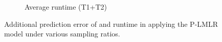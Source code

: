 \begin{figure}[tp]
\begin{subfigure}[]{0.48\columnwidth}
 		\caption{Average runtime (T1+T2)}
 		\label{fig:eval_smapling_error_time}
	\end{subfigure}
	\vspace{-0.1in}
	\caption{Additional prediction error of and runtime in applying the P-LMLR model under various
          sampling ratios.}
	\label{fig:smapling_error}
    \vspace{-0.1in}
\end{figure}




